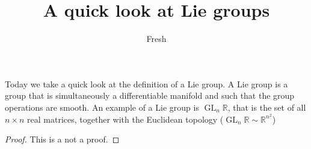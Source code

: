 \documentclass[a4paper, 12pt]{article}
\theoremstyle{definition}
\theoremstyle{plain}
\theoremstyle{remark}
\begin{document}
\author{Fresh}
\title{A quick look at Lie groups}
\maketitle


Today we take a quick look at the definition of a Lie group. A Lie group is a group that is simultaneously a differentiable manifold and such that the group operations are smooth. An example of a Lie group is \( \operatorname{GL}_n \mathbb{R} \), that is the set of all \( n \times n \) real matrices, together with the Euclidean topology (\( \operatorname{GL}_n \mathbb{R} \sim \mathbb{R}^{n^2} \))

\begin{proof}
    This is a not a proof.
\end{proof}

\end{document}

